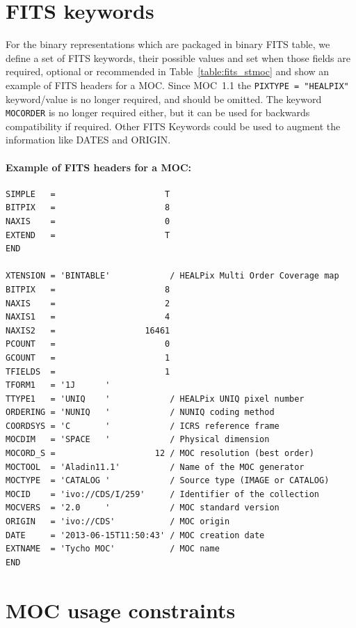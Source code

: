\documentclass[11pt,a4paper]{ivoa}
\begin{document}
\section{FITS keywords}
\label{sec:fits-key-moc} 
For the binary representations which are packaged in binary FITS table,
we define a set of FITS keywords, their possible values and set when
those fields are required, optional or recommended in
Table~\ref{table:fits_stmoc} and show an example of FITS headers for a MOC.
Since MOC~1.1 \citep{2019ivoa.spec.1007F} the {\tt PIXTYPE = "HEALPIX"}
keyword/value is no longer required, and should be omitted. 
The keyword {\tt MOCORDER} is no longer required either, but it can be used for
backwards compatibility if required.
Other FITS Keywords could be used to augment the information like DATES and ORIGIN. 
 

 
\paragraph{Example of FITS headers for a MOC:}
\par\noindent
\begin{lstlisting}[basicstyle=\footnotesize\ttfamily]
SIMPLE   =                      T
BITPIX   =                      8
NAXIS    =                      0
EXTEND   =                      T
END
    
XTENSION = 'BINTABLE'            / HEALPix Multi Order Coverage map
BITPIX   =                      8
NAXIS    =                      2
NAXIS1   =                      4
NAXIS2   =                  16461
PCOUNT   =                      0
GCOUNT   =                      1
TFIELDS  =                      1
TFORM1   = '1J      '
TTYPE1   = 'UNIQ    '            / HEALPix UNIQ pixel number
ORDERING = 'NUNIQ   '            / NUNIQ coding method
COORDSYS = 'C       '            / ICRS reference frame
MOCDIM   = 'SPACE   '            / Physical dimension
MOCORD_S =                    12 / MOC resolution (best order)
MOCTOOL  = 'Aladin11.1'          / Name of the MOC generator
MOCTYPE  = 'CATALOG '            / Source type (IMAGE or CATALOG)
MOCID    = 'ivo://CDS/I/259'     / Identifier of the collection
MOCVERS  = '2.0     '            / MOC standard version
ORIGIN   = 'ivo://CDS'           / MOC origin
DATE     = '2013-06-15T11:50:43' / MOC creation date
EXTNAME  = 'Tycho MOC'           / MOC name
END
\end{lstlisting}

\section{MOC usage constraints}
\end{document}
